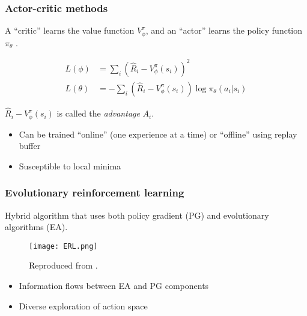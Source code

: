 \documentclass{beamer}
\begin{document}
\begin{frame}
\frametitle{Actor-critic methods}

A ``critic'' learns the value function $V^\pi_\phi$, and an ``actor'' learns the policy function $\pi_\theta$ \cite{sutton2018reinforcement}.

\begin{align}\label{eq:loss_fns}
    L(\phi) &= \sum_i (\hat{R}_i - V^\pi_\phi(s_i))^2 \\
    L(\theta) &= -\sum_i (\hat{R}_i - V^\pi_\phi(s_i))
        \log \pi_\theta(a_i|s_i)
\end{align}

$\hat{R}_i - V^\pi_\phi(s_i)$ is called the \emph{advantage} $A_i$.

\pause

\begin{itemize}
    \item Can be trained ``online'' (one experience at a time) or ``offline'' using replay buffer
    \item Susceptible to local minima
\end{itemize}

\end{frame}

\begin{frame}
\frametitle{Evolutionary reinforcement learning}

Hybrid algorithm that uses both policy gradient (PG) and evolutionary algorithms (EA).

\begin{figure}
    \centering
    \texttt{[image: ERL.png]}
    \caption{Reproduced from \cite{khadka2018evolutionguided}.}
    \label{fig:ERL}
\end{figure}
\cite{khadka2018evolutionguided}

\begin{itemize}
    \item Information flows between EA and PG components
    \item Diverse exploration of action space
\end{itemize}

\end{frame}
\end{document}
